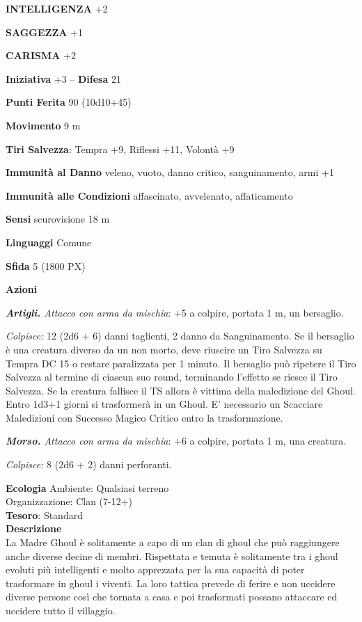 \begin{multicols}{2}
\textbf{INTELLIGENZA} +2

\textbf{SAGGEZZA} +1

\textbf{CARISMA} +2

\textbf{Iniziativa} +3 -- \textbf{Difesa} 21

\textbf{Punti Ferita} 90 (10d10+45)

\textbf{Movimento} 9 m

\textbf{Tiri Salvezza}: Tempra +9, Riflessi +11, Volontà +9

\textbf{Immunità al Danno} veleno, vuoto, danno critico, sanguinamento, armi +1

\textbf{Immunità alle Condizioni} affascinato, avvelenato, affaticamento

\textbf{Sensi} scurovisione 18 m

\textbf{Linguaggi} Comune

\textbf{Sfida} 5 (1800 PX)

\textbf{Azioni}

\textit{\textbf{Artigli.} Attacco con arma da mischia}: +5 a colpire, portata 1 m, un bersaglio.

\textit{Colpisce:} 12 (2d6 + 6) danni taglienti, 2 danno da Sanguinamento. Se il bersaglio è una creatura diverso da un non morto, deve riuscire un Tiro Salvezza su Tempra DC 15 o restare paralizzata per 1 minuto. Il bersaglio può ripetere il Tiro Salvezza al termine di ciascun suo round, terminando l'effetto se riesce il Tiro Salvezza. Se la creatura fallisce il TS allora è vittima della maledizione del Ghoul. Entro 1d3+1 giorni si trasformerà in un Ghoul. E' necessario un Scacciare Maledizioni con Successo Magico Critico entro la trasformazione.

\textit{\textbf{Morso.} Attacco con arma da mischia}: +6 a colpire, portata 1 m, una creatura.

\textit{Colpisce:} 8 (2d6 + 2) danni perforanti.

\textbf{Ecologia}
Ambiente: Qualsiasi terreno\\
Organizzazione: Clan (7-12+)\\
\textbf{Tesoro}: Standard\\
\textbf{Descrizione}\\
La Madre Ghoul è solitamente a capo di un clan di ghoul che può raggiungere anche diverse decine di membri. Rispettata e temuta è solitamente tra i ghoul evoluti più intelligenti e molto apprezzata per la sua capacità di poter trasformare in ghoul i viventi. La loro tattica prevede di ferire e non uccidere diverse persone così che tornata a casa e poi trasformati possano attaccare ed uccidere tutto il villaggio.



\end{multicols}
